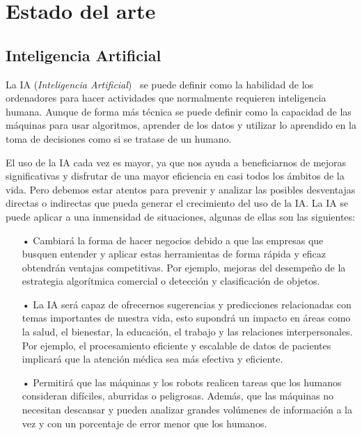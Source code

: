 \documentclass[a4paper, 12pt]{book}
\begin{document}

\cleardoublepage
\chapter{Estado del arte}
\label{chap:estado}

\section{Inteligencia Artificial} 
\label{sec:InteligenciaArtificial}

La IA (\emph{Inteligencia Artificial})~\cite{rouhiainen2018inteligencia} se puede definir como la habilidad de los ordenadores para hacer actividades que normalmente requieren inteligencia humana. 
Aunque de forma más técnica se puede definir como la capacidad de las máquinas para usar algoritmos, aprender de los datos y utilizar lo aprendido en la toma de decisiones como si se tratase de un humano.

El uso de la IA cada vez es mayor, ya que nos ayuda a beneficiarnos de mejoras significativas y disfrutar de una mayor eficiencia en casi todos los ámbitos de la vida. 
Pero debemos estar atentos para prevenir y analizar las posibles desventajas directas o indirectas que pueda generar el crecimiento del uso de la IA. 
La IA se puede aplicar a una inmensidad de situaciones, algunas de ellas son las siguientes:

\begin{itemize}

    \item[•] Cambiará la forma de hacer negocios debido a que las empresas que busquen entender y aplicar estas herramientas de forma rápida y eficaz obtendrán ventajas competitivas. 
    Por ejemplo, mejoras del desempeño de la estrategia algorítmica comercial o detección y clasificación de objetos.
    
	\item[•] La IA será capaz de ofrecernos sugerencias y predicciones relacionadas con temas importantes de nuestra vida, esto supondrá un impacto en áreas como la salud, el bienestar, la educación, el trabajo y las relaciones interpersonales. 
	Por ejemplo, el procesamiento eficiente y escalable de datos de pacientes implicará que la atención médica sea más efectiva y eficiente. 

	\item[•] Permitirá que las máquinas y los robots realicen tareas que los humanos consideran difíciles, aburridas o peligrosas. 
	Además, que las máquinas no necesitan descansar y pueden analizar grandes volúmenes de información a la vez y con un porcentaje de error menor que los humanos.
	
\end{itemize}
\end{document}
